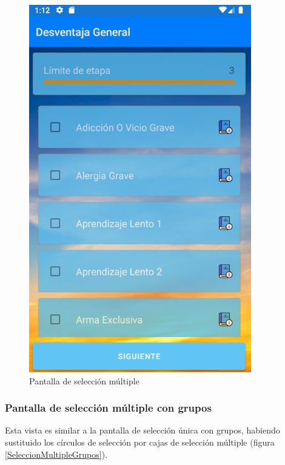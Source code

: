 \begin{figure}[H]
    \centering
    \includegraphics[scale=0.7]{Figures/Capturas/SeleccionMultiple.png}
    \caption{Pantalla de selección múltiple}
    \label{SeleccionMultiple}    
\end{figure}

\subsubsection{Pantalla de selección múltiple con grupos}
Esta vista es similar a la pantalla de selección única con grupos, habiendo sustituido los círculos de selección por 
cajas de selección múltiple (figura \ref*{SeleccionMultipleGrupos}).

